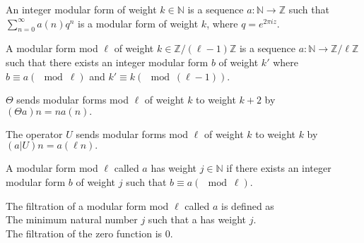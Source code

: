 \begin{definition} 
  \label{def:IntegerModularForm}
  \leanok
  An integer modular form of weight $k \in \mathbb{N}$ is a sequence $a : \mathbb{N} → \mathbb{Z}$
  such that $\sum_{n=0}^{\infty} a(n) q^n$ is a modular form of weight $k$, where $q = e ^ {2 \pi i z}.$
\end{definition}

\begin{definition} 
  \label{def:ModularFormMod}
  \leanok
  A modular form mod $\ell$ of weight $k \in \mathbb{Z} / (\ell - 1) \mathbb{Z}$ is a sequence $a : \mathbb{N} → \mathbb{Z} / \ell \mathbb{Z}$
  such that there exists an integer modular form $b$ of weight $k'$ where
  $b \equiv a (\mod \ell)$ and $k' \equiv k (\mod (\ell - 1))$.
\end{definition}


\begin{definition} [Theta]
  \label{def:Theta}
  \leanok
  $\Theta$ sends modular forms mod $\ell$ of weight $k$ to weight $k + 2$ by \\
  $(\Theta a) n = n a(n).$

\end{definition}

\begin{definition} [U Operator]
  \label{def:U_Operator}
  \leanok
  The operator $U$ sends modular forms mod $\ell$ of weight $k$ to weight $k$ by \\
  $ (a|U) n = a(\ell n).$
\end{definition}

\begin{definition} [hasWeight]
  \label{def:hasWeight}
  \leanok
  A modular form mod $\ell$ called $a$ has weight $j \in \mathbb{N}$ if
  there exists an integer modular form $b$ of weight $j$ such that $b \equiv a (\mod \ell)$.
\end{definition}

\begin{definition} [Filtration]
  \label{def:Filtration}
  \leanok
  The filtration of a modular form mod $\ell$ called $a$ is defined as \\
  The minimum natural number $j$ such that a has weight $j$. \\
  The filtration of the zero function is $0$.
\end{definition}
  
